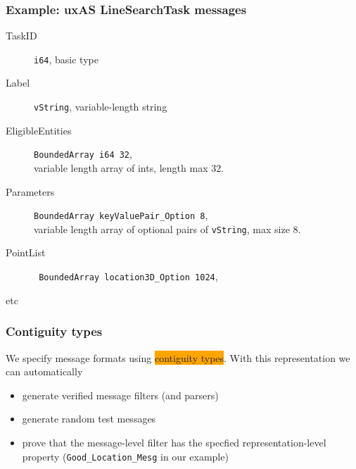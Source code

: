 \documentclass{beamer}
\newcommand{\kemph}[1]{\colorbox{orange}{#1}}
\begin{document}
\begin{frame}[fragile]\frametitle{Example: uxAS LineSearchTask messages}

\begin{description}
  \item [TaskID] \verb+i64+, basic type
  \item [Label] \verb+vString+, variable-length string
  \item [EligibleEntities] \verb+BoundedArray i64 32+, \\
    variable length array of ints, length max 32.
  \item [Parameters] \verb+BoundedArray keyValuePair_Option 8+, \\
variable length array of optional pairs of \verb+vString+, max size 8.

  \item [PointList] \verb+ BoundedArray location3D_Option 1024+, \\

  \item [etc]
\end{description}

\end{frame}

\begin{frame}[fragile]\frametitle{Contiguity types}

We specify message formats using \kemph{contiguity types}. With this
representation we can automatically

\begin{itemize}
\item generate verified message filters (and parsers)

\item generate random test messages

\item prove that the message-level filter has the specfied representation-level property
  (\verb+Good_Location_Mesg+ in our example)

\end{itemize}



\end{frame}
\end{document}
